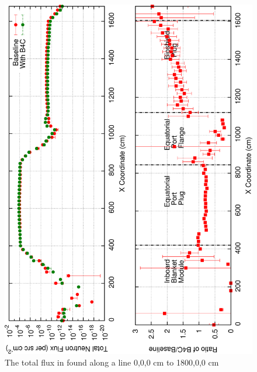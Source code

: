 \documentclass[12pt]{article}
\begin{document}
\begin{figure}[ht!]
  \centering
  \includegraphics[angle=-90,clip,scale=0.15]{../plots/neutron/total_flux_ep.png}     
  \caption{The total flux in found along a line 0,0,0 cm to 1800,0,0 cm}
  \label{fig:total_flux_ep}
\end{figure}
\end{document}
